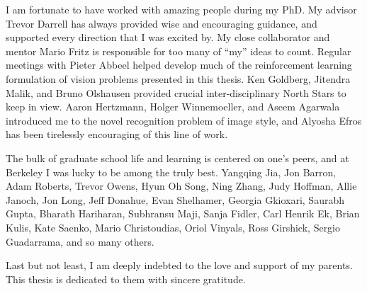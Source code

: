 \begin{acknowledgements}
I am fortunate to have worked with amazing people during my PhD.
My advisor Trevor Darrell has always provided wise and encouraging guidance, and supported every direction that I was excited by.
My close collaborator and mentor Mario Fritz is responsible for too many of ``my'' ideas to count.
Regular meetings with Pieter Abbeel helped develop much of the reinforcement learning formulation of vision problems presented in this thesis.
Ken Goldberg, Jitendra Malik, and Bruno Olshausen provided crucial inter-disciplinary North Stars to keep in view.
Aaron Hertzmann, Holger Winnemoeller, and Aseem Agarwala introduced me to the novel recognition problem of image style, and Alyosha Efros has been tirelessly encouraging of this line of work.

The bulk of graduate school life and learning is centered on one's peers, and at Berkeley I was lucky to be among the truly best.
Yangqing Jia, Jon Barron, Adam Roberts, Trevor Owens, Hyun Oh Song, Ning Zhang, Judy Hoffman, Allie Janoch, Jon Long, Jeff Donahue, Evan Shelhamer, Georgia Gkioxari, Saurabh Gupta, Bharath Hariharan, Subhransu Maji, Sanja Fidler, Carl Henrik Ek, Brian Kulis, Kate Saenko, Mario Christoudias, Oriol Vinyals, Ross Girshick, Sergio Guadarrama, and so many others.

Last but not least, I am deeply indebted to the love and support of my parents.
This thesis is dedicated to them with sincere gratitude.
\end{acknowledgements}
